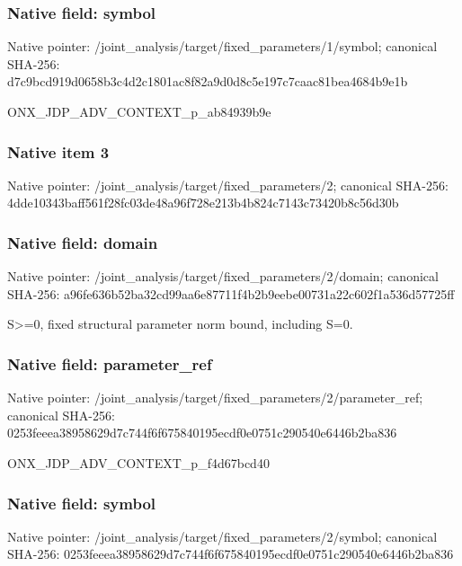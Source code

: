 \documentclass[10pt,a4paper]{article}
\begin{document}
\subsubsection{Native field: symbol}
Native pointer: /joint\_\allowbreak{}analysis/target/fixed\_\allowbreak{}parameters/1/symbol; canonical SHA-256: d7c9bcd919d0658b3c4d2c1801ac8f82a9d0d8c5e197c7caac81bea4684b9e1b

\begingroup\raggedright\sloppy ONX\_\allowbreak{}JDP\_\allowbreak{}ADV\_\allowbreak{}CONTEXT\_\allowbreak{}p\_\allowbreak{}ab84939b9e\par\endgroup

\subsubsection{Native item 3}
Native pointer: /joint\_\allowbreak{}analysis/target/fixed\_\allowbreak{}parameters/2; canonical SHA-256: 4dde10343baff561f28fc03de48a96f728e213b4b824c7143c73420b8c56d30b

\subsubsection{Native field: domain}
Native pointer: /joint\_\allowbreak{}analysis/target/fixed\_\allowbreak{}parameters/2/domain; canonical SHA-256: a96fe636b52ba32cd99aa6e87711f4b2b9eebe00731a22c602f1a536d57725ff

\begingroup\raggedright\sloppy S>=\allowbreak{}0,\allowbreak{} fixed structural parameter norm bound,\allowbreak{} including S=\allowbreak{}0.\par\endgroup

\subsubsection{Native field: parameter\_\allowbreak{}ref}
Native pointer: /joint\_\allowbreak{}analysis/target/fixed\_\allowbreak{}parameters/2/parameter\_\allowbreak{}ref; canonical SHA-256: 0253feeea38958629d7c744f6f675840195ecdf0e0751c290540e6446b2ba836

\begingroup\raggedright\sloppy ONX\_\allowbreak{}JDP\_\allowbreak{}ADV\_\allowbreak{}CONTEXT\_\allowbreak{}p\_\allowbreak{}f4d67bcd40\par\endgroup

\subsubsection{Native field: symbol}
Native pointer: /joint\_\allowbreak{}analysis/target/fixed\_\allowbreak{}parameters/2/symbol; canonical SHA-256: 0253feeea38958629d7c744f6f675840195ecdf0e0751c290540e6446b2ba836
\end{document}
